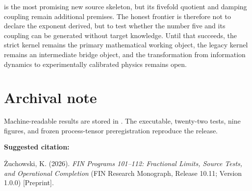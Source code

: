 \documentclass[11pt,a4paper,openany]{report}
\begin{document}
is the most promising new source skeleton, but its fivefold quotient and damping coupling remain additional premises. The honest frontier is therefore not to declare the exponent derived, but to test whether the number five and its coupling can be generated without target knowledge. Until that succeeds, the strict kernel remains the primary mathematical working object, the legacy kernel remains an intermediate bridge object, and the transformation from information dynamics to experimentally calibrated physics remains open.


\clearpage
\chapter*{Archival note}
Machine-readable results are stored in
.
The executable, twenty-two tests, nine figures, and frozen process-tensor
preregistration reproduce the release.

\medskip
\noindent\textbf{Suggested citation:}

\.Zuchowski, K. (2026). \emph{FIN Programs 101--112: Fractional Limits,
Source Tests, and Operational Completion}
(FIN Research Monograph, Release 10.11; Version 1.0.0) [Preprint].
\end{document}
